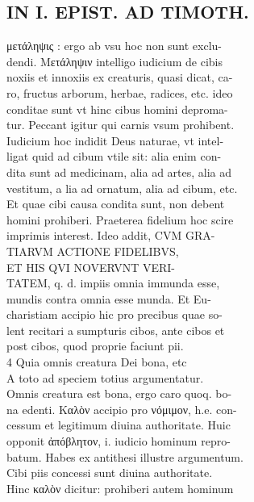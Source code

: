\documentclass{article}
\begin{document}
\begin{pages}
\section*{IN I. EPIST. AD TIMOTH. \\
                }
μετάληψις : ergo ab vsu hoc non sunt exclu- \\
                dendi. Μετάληψιν intelligo iudicium de cibis \\
                noxiis et innoxiis ex creaturis, quasi dicat, ca- \\
                ro, fructus arborum, herbae, radices, etc. ideo \\
                conditae sunt vt hinc cibus homini deproma- \\
                tur. Peccant igitur qui carnis vsum prohibent. \\
                Iudicium hoc indidit Deus naturae, vt intel- \\
                ligat quid ad cibum vtile sit: alia enim con- \\
                dita sunt ad medicinam, alia ad artes, alia ad \\
                vestitum, a lia ad ornatum, alia ad cibum, etc. \\
                Et quae cibi causa condita sunt, non debent \\
                homini prohiberi. Praeterea fidelium hoc scire \\
                imprimis interest. Ideo addit, CVM GRA- \\
                TIARVM ACTIONE FIDELIBVS, \\
                ET HIS QVI NOVERVNT VERI- \\
                TATEM, q. d. impiis omnia immunda esse, \\
                mundis contra omnia esse munda. Et Eu- \\
                charistiam accipio hic pro precibus quae so- \\
                lent recitari a sumpturis cibos, ante cibos et \\
                post cibos, quod proprie faciunt pii. \\
                4 Quia omnis creatura Dei bona, etc \\
                A toto ad speciem totius argumentatur. \\
                Omnis creatura est bona, ergo caro quoq. bo- \\
                na edenti. Καλὸν accipio pro νόμιμον, h.e. con- \\
                cessum et legitimum diuina authoritate. Huic \\
                opponit ἀπόβλητον, i. iudicio hominum repro- \\
                batum. Habes ex antithesi illustre argumentum. \\
                Cibi piis concessi sunt diuina authoritate. \\
                Hinc καλὸν dicitur: prohiberi autem hominum \\
                

\end{pages}
\end{document}
